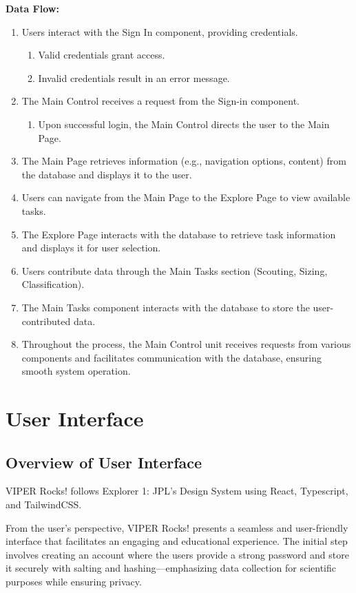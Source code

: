 \documentclass{article}
\begin{document}
\textbf{Data Flow:}
\begin{enumerate}
\item Users interact with the Sign In component, providing credentials.
	\begin{enumerate}[label=(\alph*)]
		\item Valid credentials grant access.
		\item Invalid credentials result in an error message.
	\end{enumerate}
\item The Main Control receives a request from the Sign-in component.
	\begin{enumerate}[label=(\alph*)]
		\item Upon successful login, the Main Control directs the user to the Main Page.
	\end{enumerate}
\item The Main Page retrieves information (e.g., navigation options, content) from the
database and displays it to the user.
\item Users can navigate from the Main Page to the Explore Page to view available tasks.
\item The Explore Page interacts with the database to retrieve task information and displays it
for user selection.
\item Users contribute data through the Main Tasks section (Scouting, Sizing, Classification).
\item The Main Tasks component interacts with the database to store the user-contributed data.
\item Throughout the process, the Main Control unit receives requests from various components and facilitates communication with the database, ensuring smooth system operation.
\end{enumerate}
\section{User Interface}

\subsection{Overview of User Interface}
VIPER Rocks! follows Explorer 1: JPL’s Design System using React, Typescript, and TailwindCSS.

From the user’s perspective, VIPER Rocks! presents a seamless and user-friendly interface that facilitates an engaging and educational experience. The initial step involves creating an account where the users provide a strong password and store it securely with salting and hashing—emphasizing data collection for scientific purposes while ensuring privacy.
\end{document}
